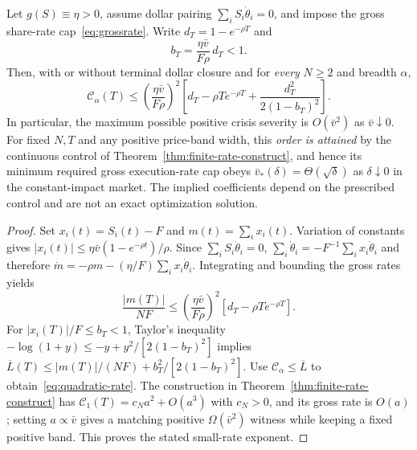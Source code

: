 \documentclass[review,hidelinks,onefignum,onetabnum]{siamonline250211}
\begin{document}
\begin{theorem}\label{thm:quadratic-rate}
Let $g(S)\equiv\eta>0$, assume dollar pairing $\sum_iS_i\dot\theta_i=0$, and impose the gross share-rate cap~\eqref{eq:grossrate}. Write $d_T=1-e^{-\rho T}$ and
\begin{equation}\label{eq:bsmall}
 b_T=\frac{\eta\bar v}{F\rho}\,d_T<1.
\end{equation}
Then, with or without terminal dollar closure and for \emph{every} $N\ge2$ and breadth $\alpha$,
\begin{equation}\label{eq:quadratic-rate}
\boxed{\ \mathcal C_\alpha(T)\le
\left(\frac{\eta\bar v}{F\rho}\right)^2
\left[d_T-\rho T e^{-\rho T}
 +\frac{d_T^2}{2(1-b_T)^2}\right].\ }
\end{equation}
In particular, the maximum possible positive crisis severity is $O(\bar v^2)$ as $\bar v\downarrow0$. For fixed $N,T$ and any positive price-band width, this \emph{order is attained} by the continuous control of Theorem~\ref{thm:finite-rate-construct}, and hence its minimum required gross execution-rate cap obeys $\bar v_*(\delta)=\Theta(\sqrt\delta)$ as $\delta\downarrow0$ in the constant-impact market. The implied coefficients depend on the prescribed control and are not an exact optimization solution.
\end{theorem}
\begin{proof}
Set $x_i(t)=S_i(t)-F$ and $m(t)=\sum_i x_i(t)$. Variation of constants gives
$|x_i(t)|\le\eta\bar v(1-e^{-\rho t})/\rho$. Since $\sum_iS_i\dot\theta_i=0$,
$\sum_i\dot\theta_i=-F^{-1}\sum_i x_i\dot\theta_i$ and therefore
$\dot m=-\rho m-(\eta/F)\sum_i x_i\dot\theta_i$. Integrating and bounding the gross rates yields
\begin{equation}\label{eq:meanprice}
\frac{|m(T)|}{NF}\le
\left(\frac{\eta\bar v}{F\rho}\right)^2
 [d_T-\rho T e^{-\rho T}].
\end{equation}
For $|x_i(T)|/F\le b_T<1$, Taylor's inequality
$-\log(1+y)\le-y+y^2/[2(1-b_T)^2]$ implies
$\overline L(T)\le |m(T)|/(NF)+b_T^2/[2(1-b_T)^2]$.
Use $\mathcal C_\alpha\le\overline L$ to obtain~\eqref{eq:quadratic-rate}. The construction in Theorem~\ref{thm:finite-rate-construct} has $\mathcal C_1(T)=c_Na^2+O(a^3)$ with $c_N>0$, and its gross rate is $O(a)$; setting $a\propto\bar v$ gives a matching positive $\Omega(\bar v^2)$ witness while keeping a fixed positive band. This proves the stated small-rate exponent.
\end{proof}
\end{document}
